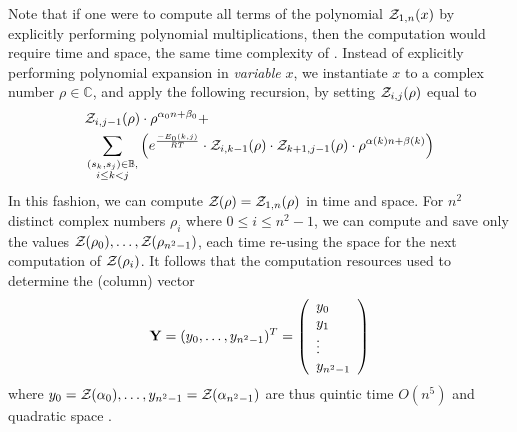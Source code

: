 Note that if one were to compute all terms of the polynomial ${\mathcal Z}_{1,n}(x)$
by explicitly performing polynomial multiplications,
then the computation would require  time and  space, the
same time complexity of \cite{hofacker:RNAbor2D}.
Instead of explicitly performing polynomial expansion in {\em variable} $x$,
we instantiate $x$ to a
complex number $\rho \in \mathbb{C}$, and apply
the following recursion, by setting ${\mathcal Z}_{i,j}(\rho)$ equal to
\begin{align}
\label{eqn:RNAborNussRecursionInstantiated}
&\emZof{i,j-1}{\rho} \cdot \rho^{\alpha_0n+\beta_0} + \\
&\sum_{\substack{(s_k,s_j) \in \bpSet,\\i\le k<j}}
\left(e^{\frac{-E_0(k,j)}{RT}}\cdot
\emZof{i,k-1}{\rho} \cdot \emZof{k+1,j-1}{\rho}
\cdot \rho^{\alpha(k)n+\beta(k)} \right) \nonumber
\end{align}
In this fashion, we can compute ${\mathcal Z}_{}(\rho)={\mathcal Z}_{1,n}(\rho)$ in
 time and  space. For $n^2$ distinct complex numbers
$\rho_i$ where $0 \leq i \leq n^2-1$, we can compute and save only the
values ${\mathcal Z}_{}(\rho_0),\dots, {\mathcal Z}_{}(\rho_{n^2-1})$, each time re-using the
 space for the next computation of ${\mathcal Z}_{}(\rho_i)$.
It follows that
the computation resources used to determine the (column) vector
\begin{align}
\label{eqn:defY}
{\bf Y} = (y_0,\dots,y_{n^2-1})^T =
\left(
\begin{array}{l}
y_0\\
y_1\\
\vdots \\
y_{n^2-1}\\
\end{array}
\right)
\end{align}
where
$y_0={\mathcal Z}_{}(\alpha_0),\dots, y_{n^2-1}={\mathcal Z}_{}(\alpha_{n^2-1})$ are thus
quintic time $O(n^5)$ and quadratic space .


